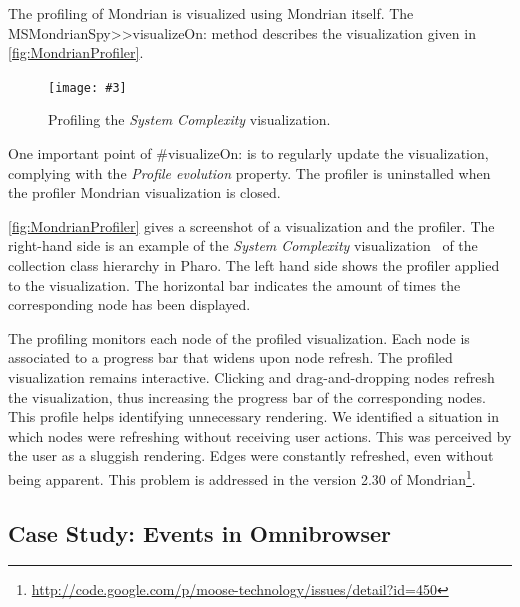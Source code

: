 \documentclass[runningheads]{llncs}
\newcommand{\ct}{\lstinline[backgroundcolor=\color{white},basicstyle=\footnotesize\ttfamily]}
\newcommand{\ab}[1]{\nb{Alexandre}{blue}{#1}}
\newcommand{\lr}[1]{\nb{Lukas}{orange}{#1}}
\newcommand{\fig}[4]{
    \begin{figure}[#1]
        \centering
        \texttt{[image: \#3]}
        \caption{\label{fig:#3}#4}
    \end{figure}}
\newcommand{\co}[1]{{\sf #1}}
\begin{document}
The profiling of Mondrian is visualized using Mondrian itself. The \co{MSMondrianSpy>>visualizeOn:} method describes the visualization given in \autoref{fig:MondrianProfiler}.


\fig{}{.8}{MondrianProfiler}{Profiling the \emph{System Complexity} visualization.}

One important point of \co{\#visualizeOn:} is to regularly update the visualization, complying with the \emph{Profile evolution} property. The profiler is uninstalled when the profiler Mondrian visualization is closed.

\autoref{fig:MondrianProfiler} gives a screenshot of a visualization and the profiler. The right-hand side is an example of the \emph{System Complexity} visualization~\cite{Lanz03d} of the collection class hierarchy in Pharo. The left hand side shows the profiler applied to the visualization. The horizontal bar indicates the amount of times the corresponding node has been displayed. %

The profiling monitors each node of the profiled visualization. Each node is associated to a progress bar that widens upon node refresh. The profiled visualization remains interactive. Clicking and drag-and-dropping nodes refresh the visualization, thus increasing the progress bar of the corresponding nodes. This profile helps identifying unnecessary rendering. We identified a situation in which nodes were refreshing without receiving user actions. This was perceived by the user as a sluggish rendering. Edges were constantly refreshed, even without being apparent. This problem is addressed in the version 2.30 of Mondrian\footnote{\url{http://code.google.com/p/moose-technology/issues/detail?id=450}}. 

\subsection{Case Study: Events in Omnibrowser}
\end{document}
